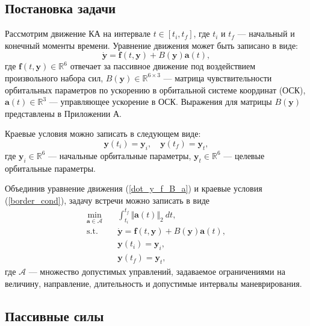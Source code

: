 \subsection{Постановка задачи}

Рассмотрим движение КА на интервале $t \in [t_i, t_f]$, где $t_i$ и $t_f$ --- начальный и конечный моменты времени. Уравнение движения может быть записано в виде:
\begin{equation}
    \dot{\mathbf{y}} = \mathbf{f}(t, \mathbf{y}) + B(\mathbf{y}) \mathbf{a}(t),
\label{dot_y_f_B_a}
\end{equation}
где $\mathbf{f}(t, \mathbf{y}) \in \mathbb{R}^{6}$ отвечает за пассивное движение под воздействием произвольного набора сил, $B(\mathbf{y}) \in \mathbb{R}^{6 \times 3}$ --- матрица чувствительности орбитальных параметров по ускорению в орбитальной системе координат (ОСК), $\mathbf{a}(t) \in \mathbb{R}^{3}$ --- управляющее ускорение в ОСК. Выражения для матрицы $B(\mathbf{y})$ представлены в Приложении А.

Краевые условия можно записать в следующем виде:
\begin{equation}
    \mathbf{y}(t_i) = \mathbf{y}_i, \quad \mathbf{y}(t_f) = \mathbf{y}_t,
\label{border_cond}
\end{equation}
где $\mathbf{y}_i \in \mathbb{R}^{6}$ --- начальные орбитальные параметры, $\mathbf{y}_t \in \mathbb{R}^{6}$ --- целевые орбитальные параметры.

Объединив уравнение движения (\ref{dot_y_f_B_a}) и краевые условия (\ref{border_cond}), задачу встречи можно записать в виде
\begin{equation}
\begin{aligned}
    \min_{\mathbf{a} \in \mathcal{A}} \quad &\int_{t_i}^{t_f} \Vert \mathbf{a}(t) \Vert_2 ~ dt, \\
    \text{s.t.} \quad &\dot{\mathbf{y}} = \mathbf{f}(t, \mathbf{y}) + B(\mathbf{y}) \mathbf{a}(t), \\
    &\mathbf{y}(t_i) = \mathbf{y}_i, \\
    &\mathbf{y}(t_f) = \mathbf{y}_t,
\end{aligned}
\label{rend_genaral_form}
\end{equation}
где $\mathcal{A}$ --- множество допустимых управлений, задаваемое ограничениями на величину, направление, длительность и допустимые интервалы маневрирования.

\subsection{Пассивные силы}

